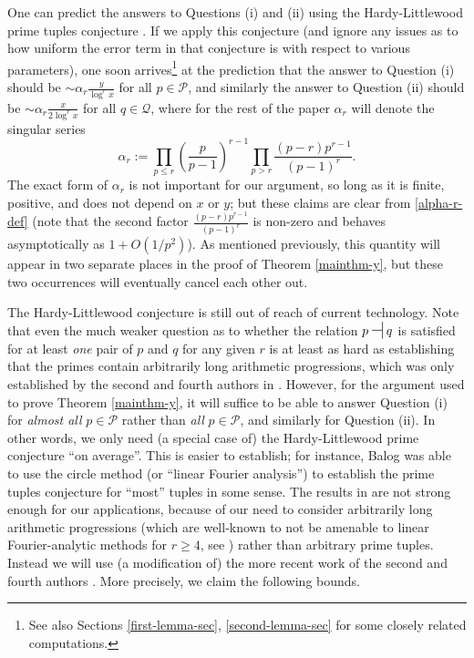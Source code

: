\documentclass[12pt]{amsart}
\numberwithin{equation}{section}  %
\theoremstyle{remark}
\theoremstyle{plain}
\numberwithin{equation}{section}
\newcommand{\be}{\begin{equation}}
\newcommand{\ee}{\end{equation}}
\renewcommand{\leq}{\leqslant}
\renewcommand{\geq}{\geqslant}
\renewcommand{\(}{\left(}
\renewcommand{\)}{\right)}
\newcommand{\asym}{\sim}   %
\newcommand{\rel}{\nsststile{}{}}  %
\newcommand{\PP}{\mathcal{P}}
\newcommand{\QQ}{\mathcal{Q}}
\begin{document}
One can predict the answers to Questions (i) and (ii) using the Hardy-Littlewood prime tuples conjecture \cite{hl}.  If we apply this conjecture (and ignore any issues as to how uniform the error term in that conjecture is with respect to various parameters), one soon arrives\footnote{See also Sections \ref{first-lemma-sec}, \ref{second-lemma-sec} for some closely related computations.} at the prediction that the answer to Question (i) should be $\asym\alpha_r \frac{y}{\log^r x}$ for all $p \in \PP$, and similarly the answer to Question (ii) should be $\asym \alpha_r \frac{x}{2\log^r x}$ for all $q \in \QQ$, where for the rest of the paper $\alpha_r$ will denote the singular series
\be\label{alpha-r-def}
 \alpha_r := \prod_{p \leq r} \left(\frac{p}{p-1}\right)^{r - 1} \prod_{p > r}\frac{(p-r)p^{r-1}}{(p-1)^r}.
\ee
The exact form of $\alpha_r$ is not important for our argument, so long as it is finite, positive, and does not depend on $x$ or $y$; but these claims are clear from \eqref{alpha-r-def} (note that the second factor $\frac{(p-r)p^{r-1}}{(p-1)^r}$ is non-zero and behaves asymptotically as $1+O(1/p^2)$).  As mentioned previously, this quantity will appear in two separate places in the proof of Theorem \ref{mainthm-y}, but these two occurrences will eventually cancel each other out. 

The Hardy-Littlewood conjecture is still out of reach of current technology.  Note that even the much weaker question as to whether the relation $p \rel q$ is satisfied for at least \emph{one} pair of $p$ and $q$ for any given $r$ is at least as hard as establishing that the primes contain arbitrarily long arithmetic progressions, which was only established by the second and fourth authors in \cite{gt-thm}.  However, for the argument used to prove Theorem \ref{mainthm-y}, it will suffice to be able to answer Question (i) for \emph{almost all} $p \in \PP$ rather than \emph{all} $p \in \PP$, and similarly for Question (ii).  In other words, we only need (a special case of) the Hardy-Littlewood prime conjecture ``on average''.  This is easier to establish; for instance, Balog \cite{balog} was able to use the circle method (or ``linear Fourier analysis'') to establish the prime tuples conjecture for ``most'' tuples in some sense.  The results in \cite{balog} are not strong enough for our applications, because of our need to consider arbitrarily long arithmetic progressions (which are well-known to not be amenable to linear Fourier-analytic methods for $r \geq 4$, see \cite{gowers-4}) rather than arbitrary prime tuples.  Instead we will use (a modification of) the more recent work of the second and fourth authors \cite{gt-linearprimes}.   More precisely, we claim the following bounds.
\end{document}
